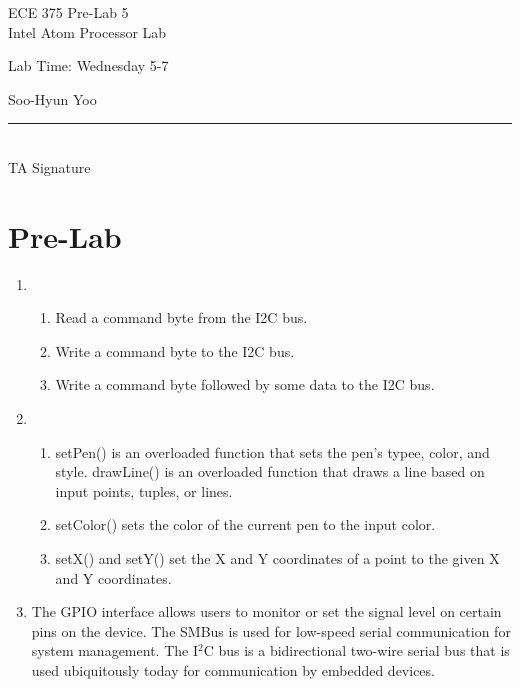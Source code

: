\documentclass[12pt,letterpaper]{article}
\begin{document}
\begin{titlepage}
    \vspace*{4cm}
    \begin{flushright}
    {\huge
        ECE 375 Pre-Lab 5\\[1cm]
    }
    {\large
        Intel Atom Processor Lab
    }
    \end{flushright}
    \begin{flushleft}
    Lab Time: Wednesday 5-7
    \end{flushleft}
    \begin{flushright}
    Soo-Hyun Yoo

    \vfill
    \rule{5in}{.5mm}\\
    TA Signature
    \end{flushright}

\end{titlepage}

\section*{Pre-Lab}

\begin{enumerate}
	\item
		\begin{enumerate}
			\item Read a command byte from the I2C bus.
			\item Write a command byte to the I2C bus.
			\item Write a command byte followed by some data to the I2C bus.
		\end{enumerate}

	\item
		\begin{enumerate}
			\item setPen() is an overloaded function that sets the pen's typee,
				color, and style. drawLine() is an overloaded function that
				draws a line based on input points, tuples, or lines.
			\item setColor() sets the color of the current pen to the input
				color.
			\item setX() and setY() set the X and Y coordinates of a point to
				the given X and Y coordinates.
		\end{enumerate}

	\item The GPIO interface allows users to monitor or set the signal level on
		certain pins on the device. The SMBus is used for low-speed serial
		communication for system management. The I$^2$C bus is a bidirectional
		two-wire serial bus that is used ubiquitously today for communication
		by embedded devices.
\end{enumerate}
\end{document}
